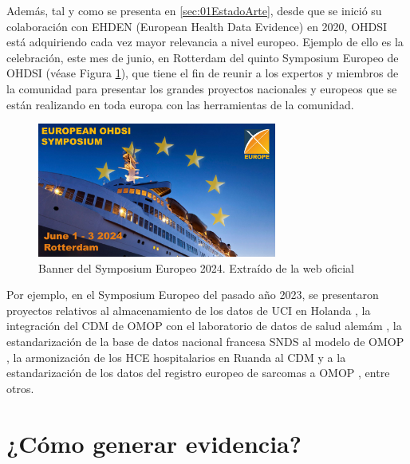 Además, tal y como se presenta en \ref{sec:01EstadoArte}, desde que se inició su colaboración con EHDEN (European Health Data Evidence) en 2020, OHDSI está adquiriendo cada vez mayor relevancia a nivel europeo. Ejemplo de ello es la celebración, este mes de junio, en Rotterdam del quinto Symposium Europeo de OHDSI (véase Figura \ref{fig:bannerSymposyum2024}), que tiene el fin de reunir a los expertos y miembros de la comunidad para presentar los grandes proyectos nacionales y europeos que se están realizando en toda europa con las herramientas de la comunidad.

\begin{figure}[H]
    \centering
    \includegraphics[width=0.70\textwidth]{figures/bannerSymposyum2024.jpg}
     \caption{Banner del Symposium Europeo 2024. Extraído de la web oficial \cite{OHDSIwebsite}}
    \label{fig:bannerSymposyum2024}
\end{figure}

Por ejemplo, en el Symposium Europeo del pasado año 2023, se presentaron proyectos relativos al almacenamiento de los datos de UCI en Holanda \cite{Jagesar2023The}, la integración del CDM de OMOP con el laboratorio de datos de salud alemám \cite{Finster2023Integrating}, la estandarización de la base de datos nacional francesa SNDS al modelo de OMOP \cite{Collumeau2023Standardization}, la armonización de los HCE hospitalarios en Ruanda al CDM \cite{Halvorsen2023Ruanda} y a la estandarización de los datos del registro europeo de sarcomas a OMOP \cite{vanSwieten2023Standardizing}, entre otros.


\section{¿Cómo generar evidencia?} \label{sec:05Evidencia}

